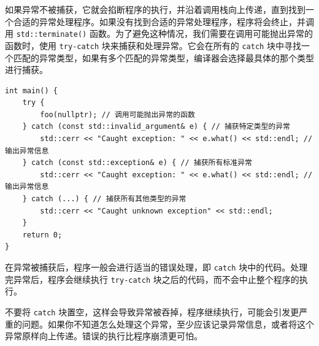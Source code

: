 如果异常不被捕获，它就会掐断程序的执行，并沿着调用栈向上传递，直到找到一个合适的异常处理程序。如果没有找到合适的异常处理程序，程序将会终止，并调用 \verb|std::terminate()| 函数。为了避免这种情况，我们需要在调用可能抛出异常的函数时，使用 \verb|try-catch| 块来捕获和处理异常。它会在所有的 \verb|catch| 块中寻找一个匹配的异常类型，如果有多个匹配的异常类型，编译器会选择最具体的那个类型进行捕获。

\begin{verbatim}
int main() {
    try {
        foo(nullptr); // 调用可能抛出异常的函数
    } catch (const std::invalid_argument& e) { // 捕获特定类型的异常
        std::cerr << "Caught exception: " << e.what() << std::endl; // 输出异常信息
    } catch (const std::exception& e) { // 捕获所有标准异常
        std::cerr << "Caught exception: " << e.what() << std::endl; // 输出异常信息
    } catch (...) { // 捕获所有其他类型的异常
        std::cerr << "Caught unknown exception" << std::endl;
    }
    return 0;
}
\end{verbatim}
在异常被捕获后，程序一般会进行适当的错误处理，即 \verb|catch| 块中的代码。处理完异常后，程序会继续执行 \verb|try-catch| 块之后的代码，而不会中止整个程序的执行。

不要将 \verb|catch| 块置空，这样会导致异常被吞掉，程序继续执行，可能会引发更严重的问题。如果你不知道怎么处理这个异常，至少应该记录异常信息，或者将这个异常原样向上传递。错误的执行比程序崩溃更可怕。